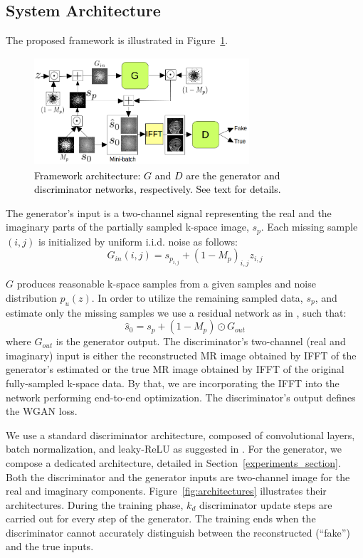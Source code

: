 \documentclass[10pt,journal,compsoc]{IEEEtran}
\begin{document}
\subsection{System Architecture}
The proposed framework is illustrated in Figure~\ref{fig:system}.
\begin{figure}[H]
	\centering{}\includegraphics[width=8.0cm,height=4cm]{include/grp2/system_chart}\caption{\label{fig:system} \textcolor{black}{\footnotesize{}{}Framework
			architecture: $G$ and $D$ are the generator and discriminator networks,
			respectively. See text for details.}}
\end{figure}

The generator's input is a two-channel signal representing the real and the imaginary parts of the partially sampled k-space image, $s_{p}$. Each missing sample $\left(i,j\right)$ is initialized by uniform i.i.d. noise as follows: 
\begin{equation}
G_{in}\left(i,j\right)=s_{p_{i,j}}+\left(1-M_{p}\right)_{i,j}z_{i,j}
\end{equation}

$G$ produces reasonable k-space samples from a given samples and noise distribution $p_{u}\left(z\right)$. In order to utilize the remaining sampled data, $s_{p}$, and estimate only the missing samples we use a residual network \cite{he2016deep} as in \cite{Oktay2016}, such that:
\begin{equation}
\hat{s}_{0}=s_{p}+\left(1-M_{p}\right)\odot G_{out}
\end{equation}
where $G_{out}$ is the generator output. The discriminator's two-channel (real and imaginary) input is either the reconstructed MR image obtained by IFFT of the generator's estimated or the true MR image obtained by IFFT of the original fully-sampled k-space data. By that, we are incorporating the IFFT into the network performing end-to-end optimization. The discriminator's output defines the WGAN loss.

We use a standard discriminator architecture, composed of convolutional layers, batch normalization, and leaky-ReLU as suggested in \cite{radford2015unsupervised}. For the generator, we compose a dedicated architecture, detailed in Section~\ref{experiments_section}. Both the discriminator and the generator inputs are two-channel image for the real and imaginary components. Figure~\ref{fig:architectures} illustrates their architectures. During the training phase, $k_{d}$ discriminator update steps are carried out for every step of the generator. The training ends when the discriminator cannot accurately distinguish between the reconstructed (``fake'') and the true inputs.
\end{document}
